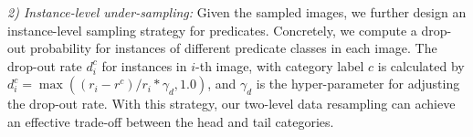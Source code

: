 %
%

\noindent\textit{2) Instance-level under-sampling:}  
Given the sampled images, we further design an instance-level sampling strategy for predicates.
Concretely, we compute a drop-out probability for instances of different predicate classes in each image. The drop-out rate $d^c_i$ for instances in $i$-th image, with category label $c$ is calculated by $d^c_i=\max((r_i - r^c) / r_i * \gamma_d, 1.0)$,  and $\gamma_d$ is the hyper-parameter for adjusting the drop-out rate.
With this strategy, our two-level data resampling can achieve an effective trade-off between the head and tail categories.



%



